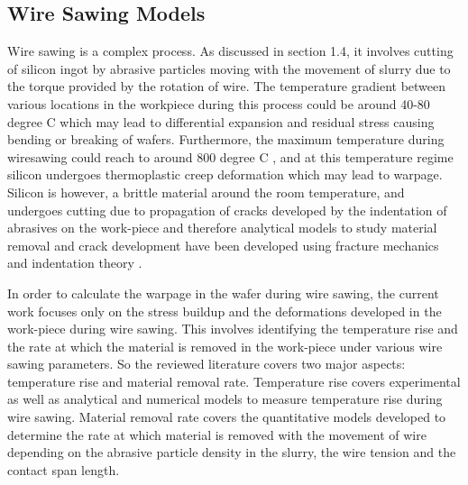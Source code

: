 \subsection{Wire Sawing Models}
Wire sawing is a complex process. As discussed in section 1.4, it involves cutting of silicon ingot by abrasive particles moving with the movement of slurry due to the torque provided by the rotation of wire. The temperature gradient between various locations in the workpiece during this process could be around 40-80 degree C \cite{} which may lead to differential expansion and residual stress causing bending or breaking of wafers. Furthermore, the maximum temperature during wiresawing could reach to around 800 degree C \cite{}, and at this temperature regime silicon undergoes thermoplastic creep deformation which may lead to warpage. Silicon is however, a brittle material around the room temperature, and undergoes cutting due to propagation of cracks developed by the indentation of abrasives on the work-piece and therefore analytical models to study material removal and crack development have been developed using fracture mechanics and indentation theory \cite{}.

In order to calculate the warpage in the wafer during wire sawing, the current work focuses only on the stress buildup and the deformations developed in the work-piece during wire sawing. This involves identifying the temperature rise and the rate at which the material is removed in the work-piece under various wire sawing parameters. So the reviewed literature covers two major aspects: temperature rise and  material removal rate. Temperature rise covers experimental \cite{} as well as analytical \cite{} and numerical \cite{} models to measure temperature rise during wire sawing. Material removal rate covers the quantitative models developed to determine the rate at which material is removed with the movement of wire depending on the abrasive particle density in the slurry, the wire tension and the contact span length. 



